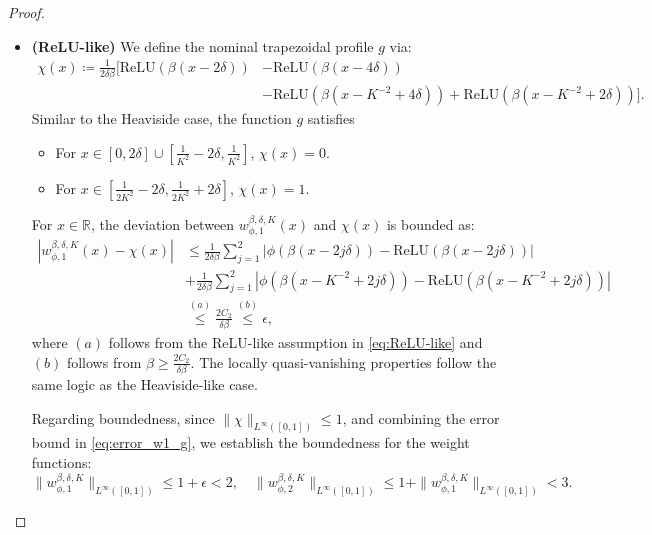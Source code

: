 \documentclass[11pt]{article}
\begin{document}
\begin{proof}
\begin{itemize}
        \item \textbf{(ReLU-like)} We define the nominal trapezoidal profile $g$ via:
        \begin{equation*}
            \begin{aligned}
                \chi(x)\coloneqq  \frac{1}{2\delta \beta} \Big[ \mathrm{ReLU}(\beta(x - 2 \delta)) &- \mathrm{ReLU}(\beta(x - 4 \delta)) \\
                &- \mathrm{ReLU}(\beta(x -K^{-2} + 4 \delta)) +  \mathrm{ReLU}(\beta(x -K^{-2} + 2\delta)) \Big]. 
            \end{aligned}
        \end{equation*}
        Similar to the Heaviside case, the function $g$ satisfies
        \begin{itemize}
            \item For $x \in [0,2\delta] \cup [\frac{1}{K^2}-2\delta,\frac{1}{K^2}]$, $\chi(x) = 0$.
            \item For $x \in [\frac{1}{2K^2} - 2\delta, \frac{1}{2K^2} + 2 \delta]$, $\chi(x) = 1$.
        \end{itemize}
        For $x \in \mathbb{R}$, the deviation between $w_{\phi,1}^{\beta, \delta, K}(x)$ and $\chi(x)$ is bounded as:
        \begin{equation}
            \begin{aligned}
                 \left|w_{\phi,1}^{\beta, \delta, K}(x) - \chi(x) \right| & \leq  \frac{1}{2 \delta \beta}\sum_{j=1}^2|\phi(\beta (x - 2j\delta)) - \mathrm{ReLU}(\beta(x - 2j \delta))|  \\
                 & + \frac{1}{2 \delta \beta} \sum_{j=1}^2 |\phi(\beta (x - K^{-2}+ 2j\delta)) - \mathrm{ReLU}(\beta(x - K^{-2}  +2 j \delta ))| \\
                 & \overset{(a)}{\leq} \frac{2 C_2}{\delta \beta} \overset{(b)}{\leq}  \epsilon,
            \end{aligned}
            \label{eq:error_w1_g}
        \end{equation}
        where $(a)$ follows from the ReLU-like assumption in \eqref{eq:ReLU-like} and $(b)$ follows from $ \beta \geq \frac{2C_2}{\delta\beta} $. The locally quasi-vanishing properties follow the same logic as the Heaviside-like case.
        

         Regarding boundedness, since $\| \chi \|_{L^{\infty}([0,1])} \leq 1$, and combining the error bound in \eqref{eq:error_w1_g}, we establish the boundedness for the weight functions:
        \begin{equation*}
            \|w_{\phi,1}^{\beta, \delta,K}\|_{L^{\infty}([0,1])} \leq 1 + \epsilon < 2, \quad \|w_{\phi,2}^{\beta, \delta,K}\|_{L^{\infty}([0,1])} \leq 1 + \|w_{\phi,1}^{\beta, \delta,K}\|_{L^{\infty}([0,1])}<3.
        \end{equation*}
    \end{itemize}
\end{proof}
\end{document}
